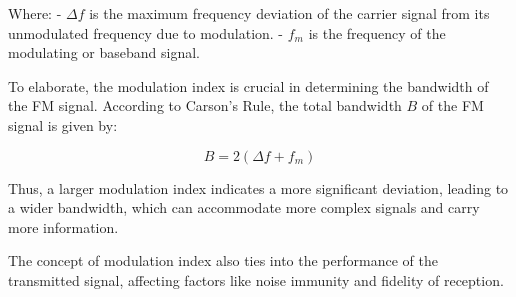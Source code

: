 Where:
- \( \Delta f \) is the maximum frequency deviation of the carrier signal from its unmodulated frequency due to modulation.
- \( f_m \) is the frequency of the modulating or baseband signal.

To elaborate, the modulation index is crucial in determining the bandwidth of the FM signal. According to Carson's Rule, the total bandwidth \( B \) of the FM signal is given by:

\[
B = 2(\Delta f + f_m)
\]

Thus, a larger modulation index indicates a more significant deviation, leading to a wider bandwidth, which can accommodate more complex signals and carry more information.

The concept of modulation index also ties into the performance of the transmitted signal, affecting factors like noise immunity and fidelity of reception. 

